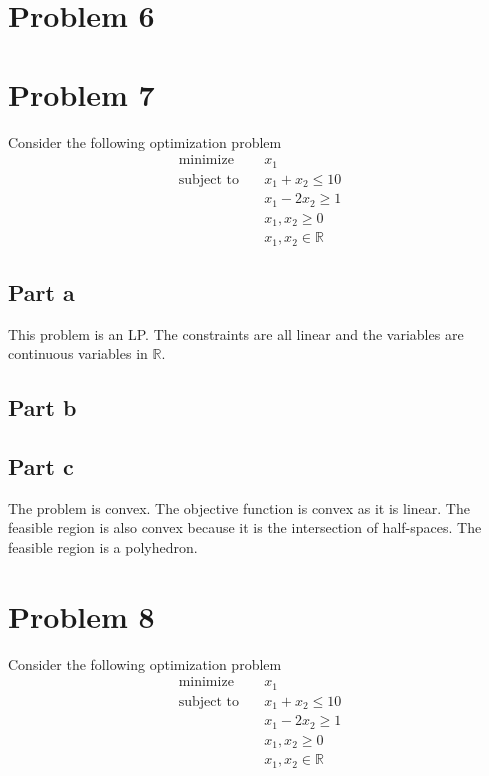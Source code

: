 \documentclass[11pt]{article}
\begin{document}
\section{Problem 6}

\section{Problem 7}
Consider the following optimization problem
\begin{align}
  \text{minimize} & \quad x_1 \\
  \text{subject to} & \quad x_1 + x_2 \leq 10 \\
  & \quad x_1 - 2x_2 \geq 1 \\
  & \quad x_1, x_2 \geq 0 \\
  & \quad x_1, x_2 \in \mathbb{R}
\end{align}

\subsection{Part a}
This problem is an LP. The constraints are all linear and the variables are continuous variables in $\mathbb{R}$.

\subsection{Part b}


\subsection{Part c}

The problem is convex. 
The objective function is convex as it is linear. 
The feasible region is also convex because it is the intersection of half-spaces.
The feasible region is a polyhedron.

\section{Problem 8}Consider the following optimization problem
\begin{align}
  \text{minimize} & \quad x_1 \\
  \text{subject to} & \quad x_1 + x_2 \leq 10 \\
  & \quad x_1 - 2x_2 \geq 1 \\
  & \quad x_1, x_2 \geq 0 \\
  & \quad x_1, x_2 \in \mathbb{R}
\end{align}
\end{document}
